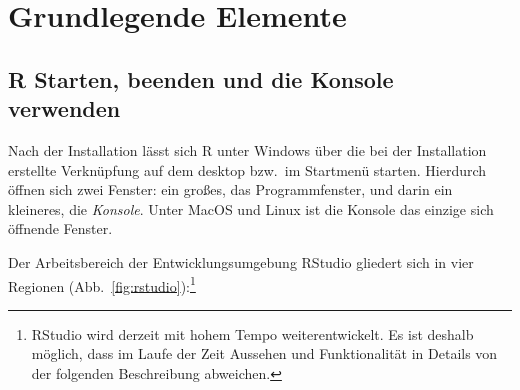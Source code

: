 \section{Grundlegende Elemente}

\subsection{R Starten, beenden und die Konsole verwenden}
\label{sec:console}

Nach der Installation lässt sich R unter Windows über die bei der Installation erstellte Verknüpfung auf dem desktop bzw.\ im Startmenü starten. Hierdurch öffnen sich zwei Fenster: ein großes, das Programmfenster, und darin ein kleineres, die \emph{Konsole}. Unter MacOS und Linux ist die Konsole das einzige sich öffnende Fenster.

Der Arbeitsbereich der Entwicklungsumgebung RStudio gliedert sich in vier Regionen (Abb.\ \ref{fig:rstudio}):\footnote{RStudio wird derzeit mit hohem Tempo weiterentwickelt. Es ist deshalb möglich, dass im Laufe der Zeit Aussehen und Funktionalität in Details von der folgenden Beschreibung abweichen.}

